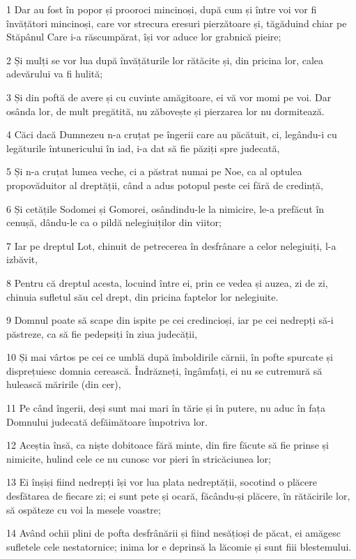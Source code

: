 \par 1 Dar au fost în popor și prooroci mincinoși, după cum și între voi vor fi învățători mincinoși, care vor strecura eresuri pierzătoare și, tăgăduind chiar pe Stăpânul Care i-a răscumpărat, își vor aduce lor grabnică pieire;
\par 2 Și mulți se vor lua după învățăturile lor rătăcite și, din pricina lor, calea adevărului va fi hulită;
\par 3 Și din poftă de avere și cu cuvinte amăgitoare, ei vă vor momi pe voi. Dar osânda lor, de mult pregătită, nu zăbovește și pierzarea lor nu dormitează.
\par 4 Căci dacă Dumnezeu n-a cruțat pe îngerii care au păcătuit, ci, legându-i cu legăturile întunericului în iad, i-a dat să fie păziți spre judecată,
\par 5 Și n-a cruțat lumea veche, ci a păstrat numai pe Noe, ca al optulea propovăduitor al dreptății, când a adus potopul peste cei fără de credință,
\par 6 Și cetățile Sodomei și Gomorei, osândindu-le la nimicire, le-a prefăcut în cenușă, dându-le ca o pildă nelegiuiților din viitor;
\par 7 Iar pe dreptul Lot, chinuit de petrecerea în desfrânare a celor nelegiuiți, l-a izbăvit,
\par 8 Pentru că dreptul acesta, locuind între ei, prin ce vedea și auzea, zi de zi, chinuia sufletul său cel drept, din pricina faptelor lor nelegiuite.
\par 9 Domnul poate să scape din ispite pe cei credincioși, iar pe cei nedrepți să-i păstreze, ca să fie pedepsiți în ziua judecății,
\par 10 Și mai vârtos pe cei ce umblă după îmboldirile cărnii, în pofte spurcate și disprețuiesc domnia cerească. Îndrăzneți, îngâmfați, ei nu se cutremură să hulească măririle (din cer),
\par 11 Pe când îngerii, deși sunt mai mari în tărie și în putere, nu aduc în fața Domnului judecată defăimătoare împotriva lor.
\par 12 Aceștia însă, ca niște dobitoace fără minte, din fire făcute să fie prinse și nimicite, hulind cele ce nu cunosc vor pieri în stricăciunea lor;
\par 13 Ei înșiși fiind nedrepți își vor lua plata nedreptății, socotind o plăcere desfătarea de fiecare zi; ei sunt pete și ocară, făcându-și plăcere, în rătăcirile lor, să ospăteze cu voi la mesele voastre;
\par 14 Având ochii plini de pofta desfrânării și fiind nesățioși de păcat, ei amăgesc sufletele cele nestatornice; inima lor e deprinsă la lăcomie și sunt fiii blestemului.
